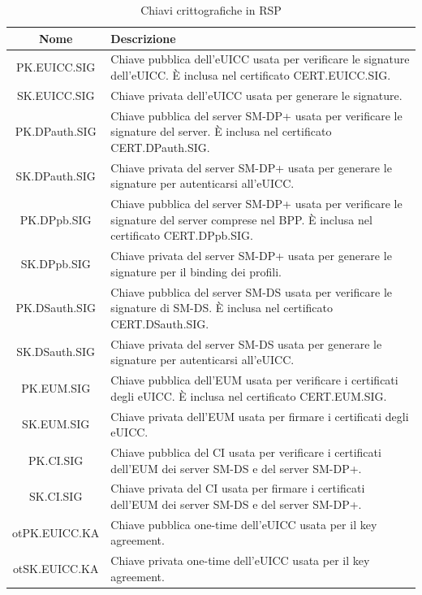 \documentclass[10pt, twoside, openany]{book}
\begin{document}
\begin{table}[h!]
\begin{center}
\captionsetup{skip=4pt}
\caption{Chiavi crittografiche in RSP}
\label{tab:keys}
\begin{tabularx}{\textwidth}{|c|X|}
\hline
\textbf{Nome} & \textbf{Descrizione}\\
\hline
PK.EUICC.SIG & Chiave pubblica dell'eUICC usata per verificare le signature dell'eUICC. È inclusa nel certificato CERT.EUICC.SIG.\\
\hline
SK.EUICC.SIG & Chiave privata dell'eUICC usata per generare le signature.\\
\hline
PK.DPauth.SIG & Chiave pubblica del server SM-DP+ usata per verificare le signature del server. È inclusa nel certificato CERT.DPauth.SIG.\\
\hline
SK.DPauth.SIG & Chiave privata del server SM-DP+ usata per generare le signature per autenticarsi all'eUICC.\\
\hline
PK.DPpb.SIG & Chiave pubblica del server SM-DP+ usata per verificare le signature del server comprese nel BPP.  È inclusa nel certificato CERT.DPpb.SIG.\\
\hline
SK.DPpb.SIG & Chiave privata del server SM-DP+ usata per generare le signature per il binding dei profili.\\
\hline
PK.DSauth.SIG & Chiave pubblica del server SM-DS usata per verificare le signature di SM-DS. È inclusa nel certificato CERT.DSauth.SIG.\\
\hline
SK.DSauth.SIG & Chiave privata del server SM-DS usata per generare le signature per autenticarsi all'eUICC.\\
\hline
PK.EUM.SIG & Chiave pubblica dell'EUM usata per verificare i certificati degli eUICC. È inclusa nel certificato CERT.EUM.SIG.\\
\hline
SK.EUM.SIG & Chiave privata dell'EUM usata per firmare i certificati degli eUICC.\\
\hline
PK.CI.SIG &  Chiave pubblica del CI usata per verificare i certificati dell'EUM dei server SM-DS e del server SM-DP+.\\
\hline
SK.CI.SIG & Chiave privata del CI usata per firmare i certificati dell'EUM dei server SM-DS e del server SM-DP+.\\
\hline
otPK.EUICC.KA & Chiave pubblica one-time dell'eUICC usata per il key agreement.\\
\hline
otSK.EUICC.KA & Chiave privata one-time dell'eUICC usata per il key agreement.\\
\hline

\end{tabularx}
\end{center}
\end{table}
\end{document}
